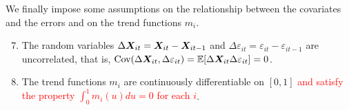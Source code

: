 \documentclass[a4paper,12pt]{article}
\begin{document}
We finally impose some assumptions on the relationship between the covariates and the errors and on the trend functions $m_i$.
\begin{enumerate}[label=(C\arabic*),leftmargin=1.05cm]
\setcounter{enumi}{6}
\item \label{C-reg-err} The random variables $\Delta \boldsymbol{X}_{it} = \boldsymbol{X}_{it} - \boldsymbol{X}_{it-1}$ and $\Delta \varepsilon_{it} = \varepsilon_{it} - \varepsilon_{it-1}$ are uncorrelated, that is, $\textnormal{Cov}(\Delta \boldsymbol{X}_{it}, \Delta \varepsilon_{it}) = \mathbb{E}[\Delta \boldsymbol{X}_{it} \Delta \varepsilon_{it}] = 0$. 
\item \label{C-trend} The trend functions $m_i$ are continuously differentiable on $[0, 1]$ \textcolor{red}{and satisfy the property $\int_0^1m_i (u)du = 0$ for each $i$}.
\end{enumerate}
\end{document}
